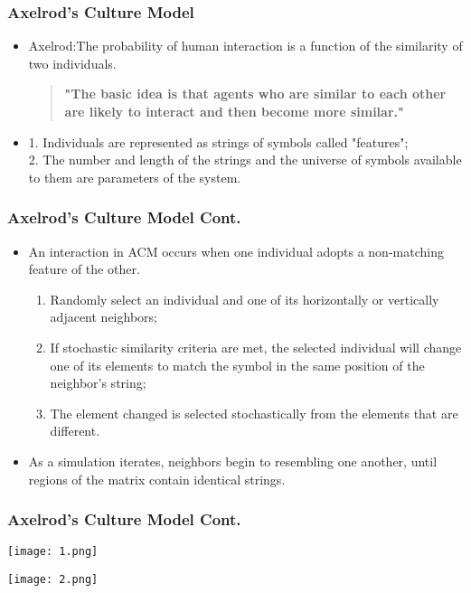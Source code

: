 \documentclass[CJK]{beamer}
\begin{document}
\begin{CJK*}{GBK}{song}
\begin{frame}
\frametitle{Axelrod's Culture Model}
\begin{itemize}
\item{Axelrod:The probability of human interaction is a function of the similarity of two individuals.}

\begin{quote}
\textbf{\textcolor[rgb]{0.00,0.53,0.68}{"The basic idea is that agents who are similar to each other are likely to interact and then become more similar."}}
\end{quote}

\item{1. Individuals are represented as strings of symbols called "features";\\
    2. The number and length of the strings and the universe of symbols available to them are parameters of the system.}
\end{itemize}
\end{frame}

\begin{frame}
\frametitle{Axelrod's Culture Model Cont.}
\begin{itemize}
\item{An interaction in ACM occurs when one individual adopts a non-matching feature of the other.}
\begin{enumerate}
\item{Randomly select an individual and one of its horizontally or vertically adjacent neighbors;}
\item{If stochastic similarity criteria are met, the selected individual will change one of its elements to match the symbol in the same position of the neighbor's string;}
\item{The element changed is selected stochastically from the elements that are different.}
\end{enumerate}
\item{As a simulation iterates, neighbors begin to resembling one another, until regions of the matrix contain identical strings.}
\end{itemize}
\end{frame}

\begin{frame}
\frametitle{Axelrod's Culture Model Cont.}
\begin{flushleft}
\texttt{[image: 1.png]}
\end{flushleft}
\begin{flushright}
\texttt{[image: 2.png]}
\end{flushright}
\end{frame}


\end{CJK*}
\end{document}
